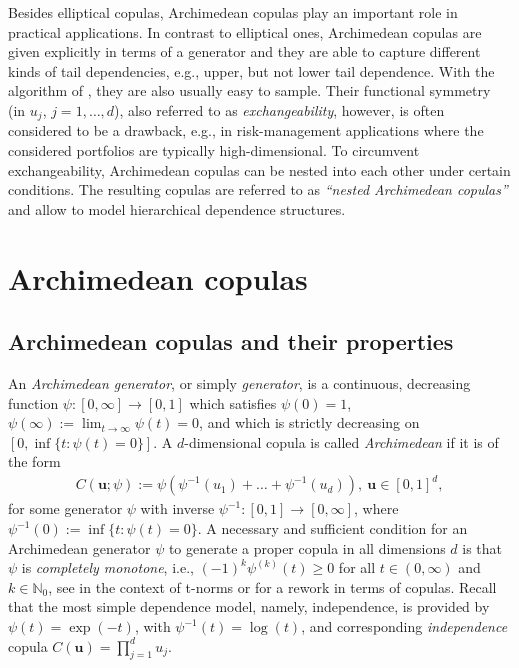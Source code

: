 \documentclass[nojss,article]{jss}
\theoremstyle{mythmstyle}
\newcommand*{\IN}{\mathbb{N}}
\newcommand*{\psii}{{\psi^{-1}}}
\begin{document}
Besides elliptical copulas, Archimedean copulas play an important role in
practical applications. In contrast to elliptical ones, Archimedean copulas
are given explicitly in terms of a generator and they are able to capture
different kinds of tail dependencies, e.g., upper, but not lower tail
dependence. With the algorithm of \citet{marshallolkin1988}, they are
also usually easy to sample. Their functional symmetry (in $u_j$,
$j=1,\dots,d$), also referred to as \textit{exchangeability}, however, is often
considered to be a drawback, e.g., in risk-management applications where the
considered portfolios are typically high-dimensional. To circumvent
exchangeability, Archimedean copulas can be nested into each other under certain
conditions. The resulting copulas are referred to as \emph{``nested Archimedean copulas''} and allow to model hierarchical dependence structures.

\section{Archimedean copulas}
\subsection{Archimedean copulas and their properties}
An \textit{Archimedean generator}, or simply \textit{generator}, is a
continuous, decreasing function $\psi:[0,\infty]\to[0,1]$ which satisfies
$\psi(0)=1$, $\psi(\infty):=\lim_{t\to\infty}\psi(t)=0$, and which is strictly
decreasing on $[0,\inf\{t:\psi(t)=0\}]$. A $d$-dimensional copula is called
\textit{Archimedean} if it is of the form
\begin{align}
  C(\bm{u};\psi):=\psi(\psii(u_1)+\dots+\psii(u_d)),\ \bm{u}\in[0,1]^d,\label{ac}
\end{align}
for some generator $\psi$ with inverse $\psii:[0,1]\to[0,\infty]$, where
$\psii(0):=\inf\{t:\psi(t)=0\}$. A necessary and sufficient condition for
an Archimedean generator $\psi$ to generate a proper copula in all
dimensions $d$ is that $\psi$ is \textit{completely monotone}, i.e.,
$(-1)^k\psi^{(k)}(t)\ge0$ for all $t\in(0,\infty)$ and $k\in\IN_0$, see
\citet{kimberling1974} in the context of t-norms or
\citet[p.\ 54]{hofert2010c} for a rework in terms of copulas.
Recall that the most simple dependence model, namely, independence, is provided
by $\psi(t)=\exp(-t)$, with $\psii(t)=\log(t)$, and corresponding
\textit{independence} copula $C({\bm u})=\prod_{j=1}^d u_j$.
\end{document}

